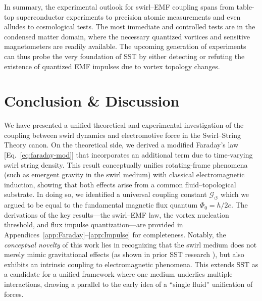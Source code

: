 \documentclass[12pt]{article}
\begin{document}
        In summary, the experimental outlook for swirl–EMF coupling spans from table-top superconductor experiments to precision atomic measurements and even alludes to cosmological tests. The most immediate and controlled tests are in the condensed matter domain, where the necessary quantized vortices and sensitive magnetometers are readily available. The upcoming generation of experiments can thus probe the very foundation of SST by either detecting or refuting the existence of quantized EMF impulses due to vortex topology changes.

\section{Conclusion \& Discussion}\label{sec:conclusion}
    We have presented a unified theoretical and experimental investigation of the coupling between swirl dynamics and electromotive force in the Swirl--String Theory canon. On the theoretical side, we derived a modified Faraday's law [Eq.~\eqref{eq:faraday-mod}] that incorporates an additional term due to time-varying swirl string density. This result conceptually unifies rotating-frame phenomena (such as emergent gravity in the swirl medium) with classical electromagnetic induction, showing that both effects arise from a common fluid–topological substrate. In doing so, we identified a universal coupling constant $\mathcal{G}_{\!\boldsymbol{\circlearrowleft}}$ which we argued to be equal to the fundamental magnetic flux quantum $\Phi_{0}=h/2e$. The derivations of the key results—the swirl–EMF law, the vortex nucleation threshold, and flux impulse quantization—are provided in Appendices~\ref{app:Faraday}--\ref{app:Impulse} for completeness. Notably, the \emph{conceptual novelty} of this work lies in recognizing that the swirl medium does not merely mimic gravitational effects (as shown in prior SST research \cite{Iskandarani2025RotatingFrame}), but also exhibits an intrinsic coupling to electromagnetic phenomena. This extends SST as a candidate for a unified framework where one medium underlies multiple interactions, drawing a parallel to the early idea of a ``single fluid'' unification of forces.
\end{document}
